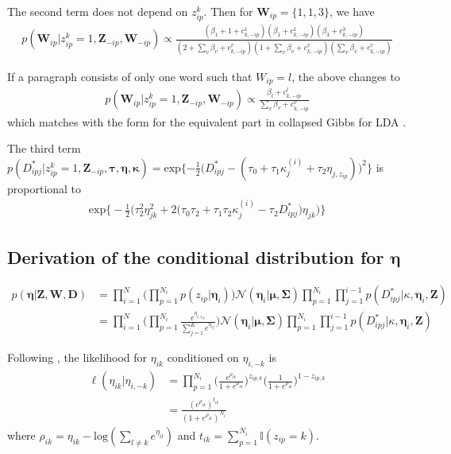 The second term does not depend on $z_{ip}^k$. Then for $\textbf{W}_{ip}=\{1,1,3\}$, we have 
\begin{align}
    p(\mathbf{W}_{ip}|z_{ip}^k=1,\mathbf{Z}_{-ip},\mathbf{W}_{-ip}) \propto \frac{(\beta_1 + 1 + c_{k,-ip}^1)(\beta_1 + c_{k,-ip}^1)(\beta_3 + c_{k,-ip}^3)}{(2+\sum_v \beta_v + c_{k,-ip}^v)(1+\sum_v \beta_v + c_{k,-ip}^v)(\sum_v \beta_v + c_{k,-ip}^v)}
\end{align}

If a paragraph consists of only one word such that $W_{ip}=l$, the above changes to 
\begin{align}
    p(\mathbf{W}_{ip}|z_{ip}^k=1,\mathbf{Z}_{-ip},\mathbf{W}_{-ip}) \propto \frac{\beta_l + c_{k,-ip}^l}{\sum_v \beta_v + c_{k,-ip}^v}
\end{align}
which matches with the form for the equivalent part in collapsed Gibbs for LDA \citep{porteous2008fast,xiao2010efficient,asuncion2012smoothing}.

The third term $p(D_{ipj}^*|z_{ip}^k=1,\textbf{Z}_{-ip},\pmb\tau,\pmb\eta,\pmb\kappa) = \text{exp}\{ -\frac{1}{2} \big(D_{ipj}^* - (\tau_0 + \tau_1\kappa_j^{(i)} + \tau_2\eta_{j,z_{ip}}) \big)^2 \}$ is proportional to 
\begin{align}
\text{exp}\Bigg\{-\frac{1}{2}\Big(\tau_2^2\eta_{jk}^2 + 2\big(\tau_0\tau_2 + \tau_1\tau_2\kappa_j^{(i)} - \tau_2 D_{ipj}^* \big)\eta_{jk} \Big) \Bigg\}
\end{align}


\subsection{Derivation of the conditional distribution for $\pmb\eta$}
\begin{align}
    p(\pmb{\eta}|\textbf{Z},\textbf{W},\textbf{D}) &= \prod_{i=1}^N \Big( \prod_{p=1}^{N_i} p(z_{ip}|\pmb\eta_i) \Big) \mathcal{N}(\pmb{\eta}_i|\pmb\mu,\pmb\Sigma) \prod_{p=1}^{N_i}\prod_{j=1}^{i-1}p(D^*_{ipj}|\kappa,\pmb\eta_i,\mathbf{Z})\nonumber \\
    &= \prod_{i=1}^N \Big(\prod_{p=1}^{N_i}\frac{e^{\eta_{i,z_{ip}}}}{\sum_{j=1}^K e^{\eta_{ij}}} \Big) \mathcal{N}(\pmb{\eta}_i|\pmb\mu,\pmb\Sigma) \prod_{p=1}^{N_i}\prod_{j=1}^{i-1}p(D^*_{ipj}|\kappa,\pmb\eta_i,\mathbf{Z})
\end{align}

Following \cite{held2006bayesian}, the likelihood for $\eta_{ik}$ conditioned on $\eta_{i,-k}$ is
\begin{align}
    \ell(\eta_{ik}|\eta_{i,-k}) &= \prod_{p=1}^{N_i} \Big(\frac{e^{\rho_{ik}}}{1+e^{\rho_{ik}}} \Big)^{z_{ip,k}} \Big(\frac{1}{1+e^{\rho_{ik}}} \Big)^{1-z_{ip,k}} \nonumber \\
    &= \frac{(e^{\rho_{ik}})^{t_{ik}}}{(1+e^{\rho_{ik}})^{N_i}}
\end{align}
where $\rho_{ik} = \eta_{ik} - \text{log}(\sum_{l \neq k} e^{\eta_{il}})$ and $t_{ik} = \sum_{p=1}^{N_i}\mathbb{I}(z_{ip}=k)$.

